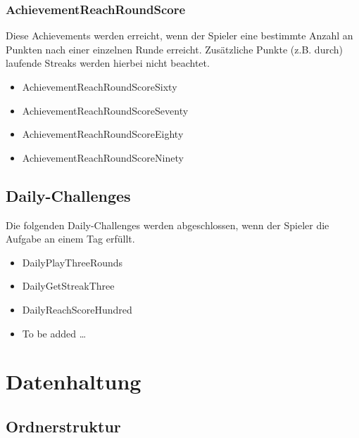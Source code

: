 \documentclass[a4paper]{scrreprt}
\begin{document}
	\subsection{AchievementReachRoundScore}
	Diese Achievements werden erreicht, wenn der Spieler eine bestimmte Anzahl an Punkten nach einer einzelnen Runde erreicht. Zusätzliche Punkte (z.B. durch) laufende Streaks werden hierbei nicht beachtet. \\
	\begin{itemize}
		\item AchievementReachRoundScoreSixty
		\item AchievementReachRoundScoreSeventy
		\item AchievementReachRoundScoreEighty
		\item AchievementReachRoundScoreNinety
	\end{itemize}


	\section{Daily-Challenges}
	\hypertarget{Daily}{}
	Die folgenden Daily-Challenges werden abgeschlossen, wenn der Spieler die Aufgabe an einem Tag erfüllt. \\
	\begin{itemize}
		\item DailyPlayThreeRounds
		\item DailyGetStreakThree
		\item DailyReachScoreHundred
		\item To be added \dots
	\end{itemize}

	
	\chapter{Datenhaltung}

    \section{Ordnerstruktur}
\end{document}
